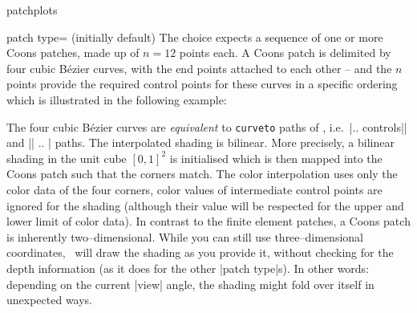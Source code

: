 {\begin{pgfplotslibrary}{patchplots}
\begin{pgfplotskey}{patch type= (initially default)}
	The choice  expects a sequence of one or more Coons patches, made up of $n=12$ points each. A Coons patch is delimited by four cubic B\'ezier curves, with the end points attached to each other -- and the $n$ points provide the required control points for these curves in a specific ordering which is illustrated in the following example:
\begin{codeexample}[]
\end{codeexample}
	\noindent The four cubic B\'ezier curves are \emph{equivalent} to \texttt{curveto} paths of \pgfname, i.e.\  |.. controls|| and || .. | paths. The interpolated shading is bilinear. More precisely, a bilinear shading in the unit cube $[0,1]^2$ is initialised which is then mapped into the Coons patch such that the corners match. The color interpolation uses only the color data of the four corners, color values of intermediate control points are ignored for the shading (although their value will be respected for the upper and lower limit of color data). In contrast to the finite element patches, a Coons patch is inherently two--dimensional. While you can still use three--dimensional coordinates, \PGFPlots\ will draw the shading as you provide it, without checking for the depth information (as it does for the other |patch type|s). In other words: depending on the current |view| angle, the shading might fold over itself in unexpected ways.


\end{pgfplotskey}
\end{pgfplotslibrary}}

